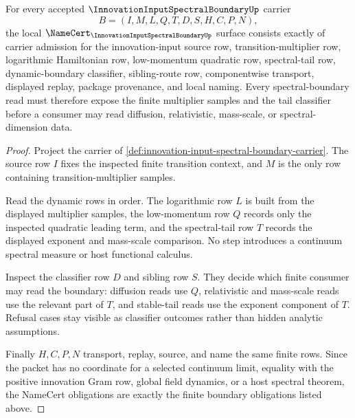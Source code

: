 \begin{theorem}
\label{thm:innovation-input-spectral-boundary-namecert-obligations}
For every accepted $\InnovationInputSpectralBoundaryUp$ carrier
$$
B=(I,M,L,Q,T,D,S,H,C,P,N),
$$
the local $\NameCert_{\InnovationInputSpectralBoundaryUp}$ surface consists exactly of carrier admission for the innovation-input source row, transition-multiplier row, logarithmic Hamiltonian row, low-momentum quadratic row, spectral-tail row, dynamic-boundary classifier, sibling-route row, componentwise transport, displayed replay, package provenance, and local naming. Every spectral-boundary read must therefore expose the finite multiplier samples and the tail classifier before a consumer may read diffusion, relativistic, mass-scale, or spectral-dimension data.
\end{theorem}
\begin{proof}
Project the carrier of \autoref{def:innovation-input-spectral-boundary-carrier}. The source row $I$ fixes the inspected finite transition context, and $M$ is the only row containing transition-multiplier samples.

Read the dynamic rows in order. The logarithmic row $L$ is built from the displayed multiplier samples, the low-momentum row $Q$ records only the inspected quadratic leading term, and the spectral-tail row $T$ records the displayed exponent and mass-scale comparison. No step introduces a continuum spectral measure or host functional calculus.

Inspect the classifier row $D$ and sibling row $S$. They decide which finite consumer may read the boundary: diffusion reads use $Q$, relativistic and mass-scale reads use the relevant part of $T$, and stable-tail reads use the exponent component of $T$. Refusal cases stay visible as classifier outcomes rather than hidden analytic assumptions.

Finally $H,C,P,N$ transport, replay, source, and name the same finite rows. Since the packet has no coordinate for a selected continuum limit, equality with the positive innovation Gram row, global field dynamics, or a host spectral theorem, the NameCert obligations are exactly the finite boundary obligations listed above.
\end{proof}

